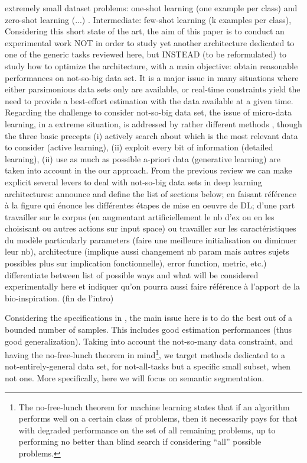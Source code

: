 \documentclass[twocolumn]{article}
\begin{document}
\begin{outline}[enumerate]
   \2 extremely small dataset problems:  one-shot learning (one example per class) and zero-shot learning (...) \cite[presents them as transfer learning tasks]{Goodfellow2016Representation}. Intermediate: few-shot learning (k examples per class),
\1 Considering this short state of the art, the aim of this paper is to conduct an experimental work NOT in order to study yet another architecture dedicated to one of the generic tasks reviewed here, but INSTEAD (to be reformulated) to study how to optimize the architecture, with a main objective: obtain reasonable performances on not-so-big data set.
\1 It is a major issue in many situations where either parsimonious data sets only are available, or real-time constraints yield the need to provide a best-effort estimation with the data available at a given time.
\1 Regarding the challenge to consider not-so-big data set, the issue of micro-data learning, in a extreme situation, is addressed by rather different methods \cite{Mouret2016Micro}, though the three basic precepts (i) actively search about which is the most relevant data to consider (active learning), (ii) exploit every bit of information (detailed learning), (ii) use as much as possible a-priori data (generative learning) are taken into account in the our approach.
\1 From the previous review we can make explicit several levers to deal with not-so-big data sets in deep learning architectures: announce and define the list of sections below; en faisant référence à la figure qui énonce les différentes étapes de mise en oeuvre de DL; 
d'une part travailler sur le corpus (en augmentant artificiellement le nb d'ex ou en les choisisant ou autres actions sur input space) ou travailler sur les caractéristiques du modèle particularly parameters (faire une meilleure initialisation ou diminuer leur nb), architecture (implique aussi changement nb param mais autres sujets possibles plus sur implication fonctionnelle), error function, metric, etc.) 
\1 differentiate between list of possible ways and what will be considered experimentally here et indiquer qu'on pourra aussi faire référence à l'apport de la bio-inspiration.  (fin de l'intro)
\end{outline}

Considering the specifications in \cite{Bengio2007Scaling}, the main issue here is to do the best out of a bounded number of samples. This includes good estimation performances (thus good generalization). Taking into account the not-so-many data constraint, and having the no-free-lunch theorem in mind\footnote{The no-free-lunch theorem for machine learning states that if an algorithm performs well on a certain class of problems, then it necessarily pays for that with degraded performance on the set of all remaining problems, up to performing no better than blind search if considering ``all'' possible problems.}, we target methods dedicated to a not-entirely-general data set, for not-all-tasks but a specific small subset, when not one.
More specifically, here we will focus on semantic segmentation.
\end{document}
